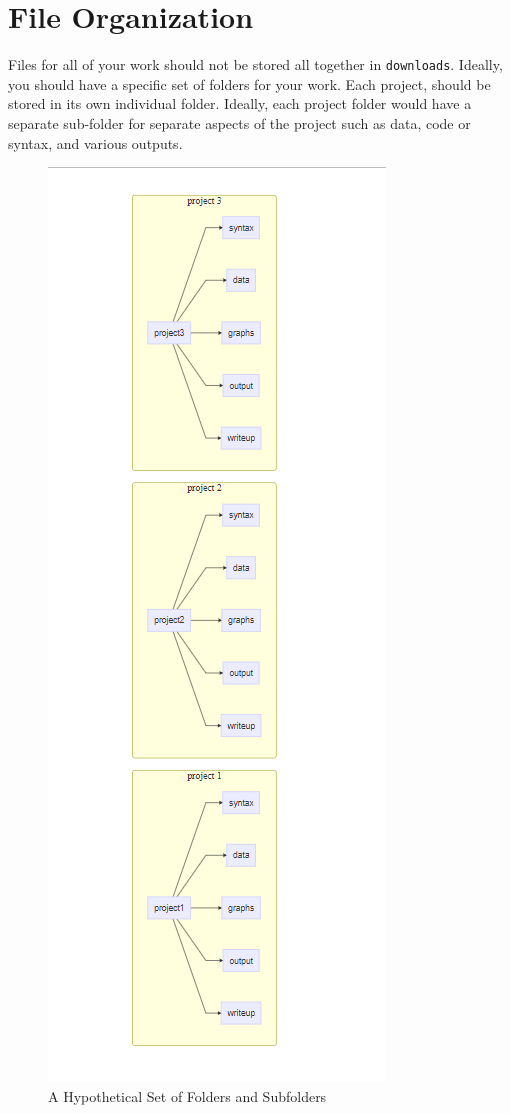 \documentclass[
  letterpaper,
  DIV=11,
  numbers=noendperiod]{scrreprt}
\begin{document}
\section{File Organization}\label{file-organization}

Files for all of your work should not be stored all together in
\texttt{downloads}. Ideally, you should have a specific set of folders
for your work. Each project, should be stored in its own individual
folder. Ideally, each project folder would have a separate sub-folder
for separate aspects of the project such as data, code or syntax, and
various outputs.

\begin{figure}[H]

{\centering \includegraphics{storage.png}

}

\caption{A Hypothetical Set of Folders and Subfolders}

\end{figure}%
\end{document}

